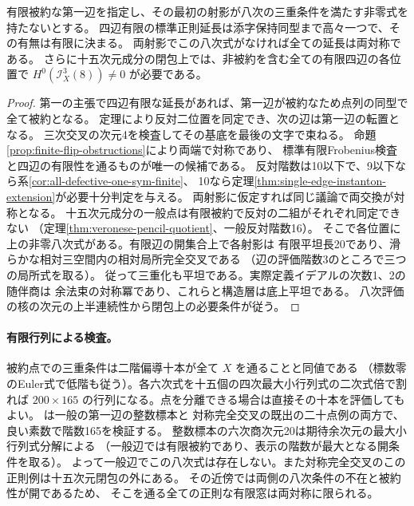 \begin{corollary}\label{cor:octic-free-finite-extension}
有限被約な第一辺を指定し、その最初の射影が八次の三重条件を満たす非零式を持たないとする。
四辺有限の標準正則延長は添字保持同型まで高々一つで、その有無は有限に決まる。
両射影でこの八次式がなければ全ての延長は両対称である。
さらに十五次元成分の閉包上では、非被約を含む全ての有限四辺の各位置で
$H^0(\mathcal I_X^3(8))\ne0$ が必要である。
\end{corollary}
\begin{proof}
第一の主張で四辺有限な延長があれば、第一辺が被約なため点列の同型で全て被約となる。
定理により反対二位置を同定でき、次の辺は第一辺の転置となる。
三次交叉の次元4を検査してその基底を最後の文字で束ねる。
命題\ref{prop:finite-flip-obstructions}により両端で対称であり、
標準有限Frobenius検査と四辺の有限性を通るものが唯一の候補である。
反対階数は10以下で、9以下なら系\ref{cor:all-defective-one-sym-finite}、
10なら定理\ref{thm:single-edge-instanton-extension}が必要十分判定を与える。
両射影に仮定すれば同じ議論で両交換が対称となる。
十五次元成分の一般点は有限被約で反対の二組がそれぞれ同定できない
（定理\ref{thm:veronese-pencil-quotient}、一般反対階数16）。
そこで各位置に上の非零八次式がある。有限辺の開集合上で各射影は
有限平坦長20であり、滑らかな相対三空間内の相対局所完全交叉である
（辺の評価階数3のところで三つの局所式を取る）。
従って三重化も平坦である。実際定義イデアルの次数1、2の随伴商は
余法束の対称冪であり、これらと構造層は底上平坦である。
八次評価の核の次元の上半連続性から閉包上の必要条件が従う。
\end{proof}

\paragraph{有限行列による検査。}
被約点での三重条件は二階偏導十本が全て $X$ を通ることと同値である
（標数零のEuler式で低階も従う）。各六次式を十五個の四次最大小行列式の二次式倍で割れば
$200\times165$ の行列になる。点を分離できる場合は直接その十本を評価してもよい。
 は一般の第一辺の整数標本と
対称完全交叉の既出の二十点例の両方で、良い素数で階数165を検証する。
整数標本の六次商次元20は期待余次元の最大小行列式分解による
（一般辺では有限被約であり、表示の階数が最大となる開条件を取る）。
よって一般辺でこの八次式は存在しない。また対称完全交叉のこの正則例は十五次元閉包の外にある。
その近傍では両側の八次条件の不在と被約性が開であるため、
そこを通る全ての正則な有限窓は両対称に限られる。
